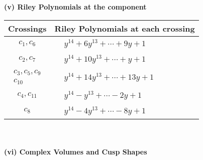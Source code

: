 \documentclass[1p]{elsarticle_modified}
\theoremstyle{definition}
\begin{document}
\newpage\renewcommand{\arraystretch}{1}
\flushleft \textbf{(v) Riley Polynomials at the component}\newline \\
\begin{tabular}{m{50pt}|m{274pt}}
Crossings & \hspace{64pt}Riley Polynomials at each crossing \\
\hline $$\begin{aligned}c_{1},c_{6}\end{aligned}$$&$\begin{aligned}
&y^{14}+6 y^{13}+\cdots+9 y+1
\end{aligned}$\\
\hline $$\begin{aligned}c_{2},c_{7}\end{aligned}$$&$\begin{aligned}
&y^{14}+10 y^{13}+\cdots+y+1
\end{aligned}$\\
\hline $$\begin{aligned}c_{3},c_{5},c_{9}\\c_{10}\end{aligned}$$&$\begin{aligned}
&y^{14}+14 y^{13}+\cdots+13 y+1
\end{aligned}$\\
\hline $$\begin{aligned}c_{4},c_{11}\end{aligned}$$&$\begin{aligned}
&y^{14}- y^{13}+\cdots-2 y+1
\end{aligned}$\\
\hline $$\begin{aligned}c_{8}\end{aligned}$$&$\begin{aligned}
&y^{14}-4 y^{13}+\cdots-8 y+1
\end{aligned}$\\
\hline
\end{tabular}\\~\\
\newpage\flushleft \textbf{(vi) Complex Volumes and Cusp Shapes}
\end{document}
